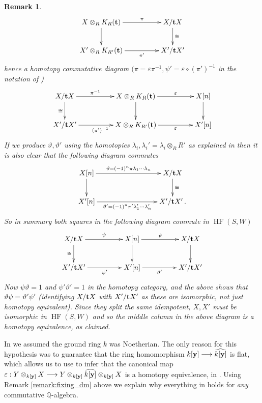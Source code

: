 \documentclass[english,letter paper,12pt,leqno]{article}
\theoremstyle{example}
\newtheorem{remark}[theorem]{Remark}
\numberwithin{equation}{section}
\DeclareMathOperator{\HF}{HF}
\begin{document}
\begin{remark}
\[
\xymatrix@C+2pc{
X \otimes_R K_R(\bold{t}) \ar[d]\ar[r]^-\pi & X/\bold{t} X \ar[d]^-{\cong}\\
X' \otimes_R K_{R'}(\bold{t}) \ar[r]_-{\pi'} & X'/\bold{t} X'
}
\]
hence a homotopy commutative diagram $(\pi = \varepsilon \pi^{-1}, \psi' = \varepsilon \circ (\pi')^{-1}$ in the notation of \cite{pushforward})
\[
\xymatrix@C+2pc{
X/\bold{t} X \ar[d]_-{\cong} \ar[r]^-{\pi^{-1}} & X \otimes_R K_R(\bold{t}) \ar[d] \ar[r]^-\varepsilon & X[n] \ar[d]\\
X'/\bold{t} X' \ar[r]_{(\pi')^{-1}} & X \otimes_R K_{R'}(\bold{t}) \ar[r]_-{\varepsilon} & X'[n]
}
\]
If we produce $\vartheta, \vartheta'$ using the homotopies $\lambda_i, \lambda_i' = \lambda_i \otimes_R R'$ as explained in \cite[\S 4]{pushforward} then it is also clear that the following diagram commutes
\[
\xymatrix@C+5pc{
X[n] \ar[d] \ar[r]^-{\vartheta = (-1)^n \pi \lambda_1 \cdots \lambda_n} & X/\bold{t} X \ar[d]^-{\cong} \\
X'[n] \ar[r]_-{\vartheta' = (-1)^n \pi' \lambda_1' \cdots \lambda_n'} & X'/\bold{t} X'\,.
}
\]
So in summary both squares in the following diagram commute in $\HF(S,W)$
\[
\xymatrix@C+2pc{
X/\bold{t} X \ar[d]_-{\cong} \ar[r]^-{\psi} & X[n] \ar[d] \ar[r]^-\vartheta & X/\bold{t} X \ar[d]\\
X'/\bold{t} X' \ar[r]_-{\psi'} & X'[n] \ar[r]_-{\vartheta'} & X'/\bold{t} X'
}
\]
Now $\psi \vartheta = 1$ and $\psi' \vartheta' = 1$ in the homotopy category, and the above shows that $\vartheta \psi = \vartheta' \psi'$ (identifying $X/\bold{t} X$ with $X'/\bold{t} X'$ as these are isomorphic, not just homotopy equivalent). Since they split the same idempotent, $X, X'$ must be isomorphic in $\HF(S,W)$ and so the middle column in the above diagram is a homotopy equivalence, as claimed.
\end{remark}

In \cite{cut} we assumed the ground ring $k$ was Noetherian. The only reason for this hypothesis was to guarantee that the ring homomorphism $k[\bold{y}] \longrightarrow \widehat{k[\bold{y}]}$ is flat, which allows us to use \cite[Remark 7.7]{pushforward} to infer that the canonical map $\varepsilon: Y \otimes_{k[\bold{y}]} X \longrightarrow Y \otimes_{k[\bold{y}]} \widehat{k[\bold{y}]} \otimes_{k[\bold{y}]} X$ is a homotopy equivalence, in \cite[\S 4.3]{cut}. Using Remark \ref{remark:fixing_dm} above we explain why everything in \cite{cut} holds for \emph{any} commutative $\mathbb{Q}$-algebra.
\end{document}
